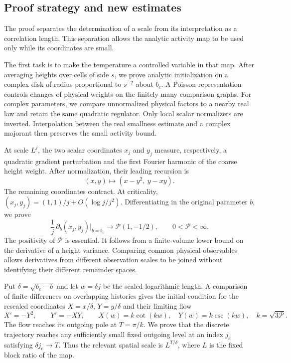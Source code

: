 \subsection{Proof strategy and new estimates}
The proof separates the determination of a scale from its interpretation as a correlation length. This separation allows the analytic activity map to be used only while its coordinates are small.

The first task is to make the temperature a controlled variable in that map. After averaging heights over cells of side $s$, we prove analytic initialization on a complex disk of radius proportional to $s^{-2}$ about $b_c$. A Poisson representation controls changes of physical weights on the finitely many comparison graphs. For complex parameters, we compare unnormalized physical factors to a nearby real law and retain the same quadratic regulator. Only local scalar normalizers are inverted. Interpolation between the real smallness estimate and a complex majorant then preserves the small activity bound.

At scale $L^j$, the two scalar coordinates $x_j$ and $y_j$ measure, respectively, a quadratic gradient perturbation and the first Fourier harmonic of the coarse height weight. After normalization, their leading recursion is
\begin{equation}\label{eq:intro-map}
 (x,y)\longmapsto(x-y^2,\ y-xy).
\end{equation}
The remaining coordinates contract. At criticality, $(x_j,y_j)=(1,1)/j+O(\log j/j^2)$. Differentiating in the original parameter $b$, we prove
\begin{equation}\label{eq:intro-response}
 \frac1j\,\partial_b(x_j,y_j)\big|_{b=b_c}
       \longrightarrow\mathcal P(1,-1/2),\qquad 0<\mathcal P<\infty.
\end{equation}
The positivity of $\mathcal P$ is essential. It follows from a finite-volume lower bound on the derivative of a height variance. Comparing common physical observables allows derivatives from different observation scales to be joined without identifying their different remainder spaces.

Put $\delta=\sqrt{b_c-b}$ and let $w=\delta j$ be the scaled logarithmic length. A comparison of finite differences on overlapping histories gives the initial condition for the rescaled coordinates $X=x/\delta$, $Y=y/\delta$ and their limiting flow
\begin{equation}\label{eq:intro-flow}
 X'=-Y^2,\qquad Y'=-XY,\qquad
 X(w)=k\cot(kw),\quad Y(w)=k\csc(kw),\quad k=\sqrt{3\mathcal P}.
\end{equation}
The flow reaches its outgoing pole at $T=\pi/k$. We prove that the discrete trajectory reaches any sufficiently small fixed outgoing level at an index $j_e$ satisfying $\delta j_e\to T$. Thus the relevant spatial scale is $L^{T/\delta}$, where $L$ is the fixed block ratio of the map.

